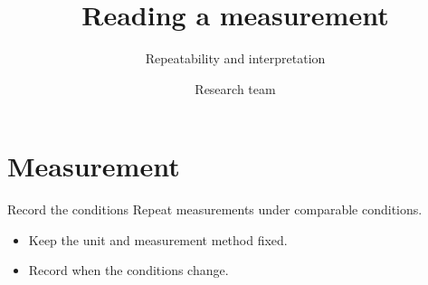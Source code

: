 \documentclass[aspectratio=169,t]{beamer}
\title{Reading a measurement}
\subtitle{Repeatability and interpretation}
\author{Research team}
\institute{Research seminar}
\date{}
\begin{document}
\maketitle
\section{Measurement}
\begin{frame}{Record the conditions}
Repeat measurements under comparable conditions.
\CoreParagraphToList
\begin{itemize}
  \item Keep the unit and measurement method fixed.
  \item Record when the conditions change.
\end{itemize}
\end{frame}
\end{document}
